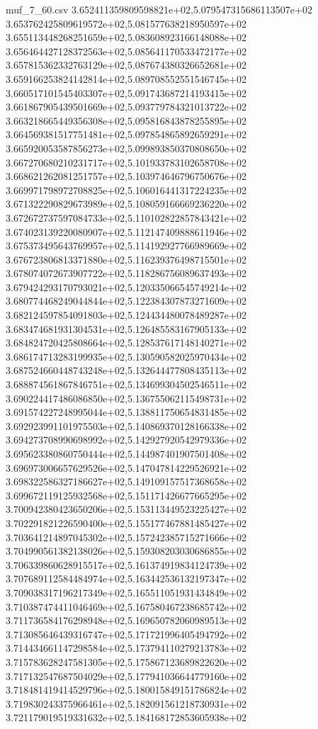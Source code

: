 \begin{filecontents*}{muf_7_60.csv}
3.652411359809598821e+02,5.079547315686113507e+02
3.653762425809619572e+02,5.081577638218950597e+02
3.655113448268251659e+02,5.083608923166148088e+02
3.656464427128372563e+02,5.085641170533472177e+02
3.657815362332763129e+02,5.087674380326652681e+02
3.659166253824142814e+02,5.089708552551546745e+02
3.660517101545403307e+02,5.091743687214193415e+02
3.661867905439501669e+02,5.093779784321013722e+02
3.663218665449356308e+02,5.095816843878255895e+02
3.664569381517751481e+02,5.097854865892659291e+02
3.665920053587856273e+02,5.099893850370808650e+02
3.667270680210231717e+02,5.101933783102658708e+02
3.668621262081251757e+02,5.103974646796750676e+02
3.669971798972708825e+02,5.106016441317224235e+02
3.671322290829673989e+02,5.108059166669236220e+02
3.672672737597084733e+02,5.110102822857843421e+02
3.674023139220080907e+02,5.112147409888611946e+02
3.675373495643769957e+02,5.114192927766989669e+02
3.676723806813371880e+02,5.116239376498715501e+02
3.678074072673907722e+02,5.118286756089637493e+02
3.679424293170793021e+02,5.120335066545749214e+02
3.680774468249044844e+02,5.122384307873271609e+02
3.682124597854091803e+02,5.124434480078489287e+02
3.683474681931304531e+02,5.126485583167905133e+02
3.684824720425808664e+02,5.128537617148140271e+02
3.686174713283199935e+02,5.130590582025970434e+02
3.687524660448743248e+02,5.132644477808435113e+02
3.688874561867846751e+02,5.134699304502546511e+02
3.690224417486086850e+02,5.136755062115498731e+02
3.691574227248995044e+02,5.138811750654831485e+02
3.692923991101975503e+02,5.140869370128166338e+02
3.694273708990698992e+02,5.142927920542979336e+02
3.695623380860750444e+02,5.144987401907501408e+02
3.696973006657629526e+02,5.147047814229526921e+02
3.698322586327186627e+02,5.149109157517368658e+02
3.699672119125932568e+02,5.151171426677665295e+02
3.700942380423650206e+02,5.153113449523225427e+02
3.702291821226590400e+02,5.155177467881485427e+02
3.703641214897045302e+02,5.157242385715271666e+02
3.704990561382138026e+02,5.159308203030686855e+02
3.706339860628915517e+02,5.161374919834124739e+02
3.707689112584484974e+02,5.163442536132197347e+02
3.709038317196217349e+02,5.165511051931434849e+02
3.710387474411046469e+02,5.167580467238685742e+02
3.711736584176298948e+02,5.169650782060989513e+02
3.713085646439316747e+02,5.171721996405494792e+02
3.714434661147298584e+02,5.173794110279213783e+02
3.715783628247581305e+02,5.175867123689822620e+02
3.717132547687504029e+02,5.177941036644779160e+02
3.718481419414529796e+02,5.180015849151786824e+02
3.719830243375966461e+02,5.182091561218730931e+02
3.721179019519331632e+02,5.184168172853605938e+02

\end{filecontents*}
